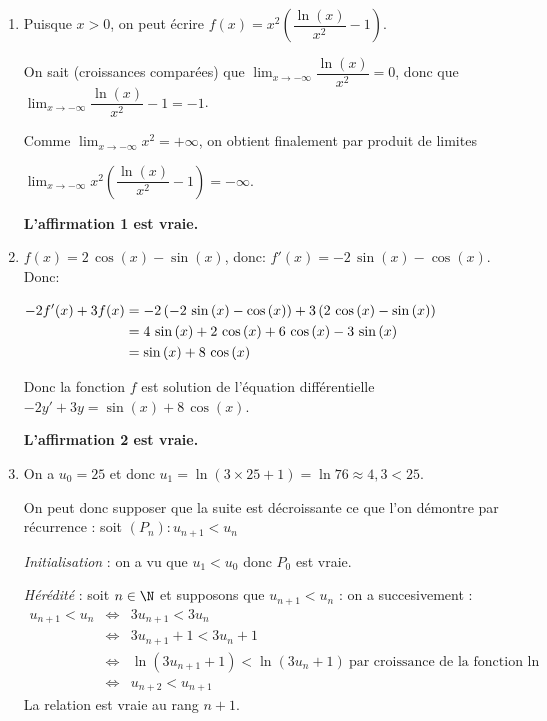 

\smallskip

\begin{enumerate}
\item Puisque $x > 0$, on peut écrire $f(x) = x^2\left(\dfrac{\ln (x)}{x^2}  - 1\right)$.

On sait (croissances comparées) que $\displaystyle\lim_{x \to - \infty} \dfrac{\ln (x)}{x^2} = 0$, donc que $\displaystyle\lim_{x \to - \infty} \dfrac{\ln (x)}{x^2} - 1 = - 1$.

Comme $\displaystyle\lim_{x \to - \infty}x^2 = + \infty$, on obtient finalement par produit de limites 

$\displaystyle\lim_{x \to - \infty} x^2 \left(\dfrac{\ln (x)}{x^2}  - 1\right) = - \infty$.

\hfill\textbf{L'affirmation 1 est vraie.}

\item $f(x)=2\,\cos\left (x\right )- \sin\left (x\right )$, donc:
$f'(x)= -2\,\sin\left (x\right ) - \cos\left (x\right )$. Donc:

$\aligned[t]
- 2f'(x) + 3f(x) 
& = -2\left ( -2\,\sin\left (x\right ) - \cos\left (x\right )\right ) +3 \left (2\,\cos\left (x\right )- \sin\left (x\right ) \right )\\
& = 4\,\sin\left (x\right ) +2\,\cos\left (x\right ) +6\,\cos\left (x\right ) -3\,\sin\left (x\right )\\
 & = \sin\left (x\right ) +8\,\cos\left (x\right )
\endaligned$

Donc la fonction $f$ est solution de l'équation différentielle $-2y' +3y =  \sin\left (x\right ) +8\,\cos\left (x\right )$.

\hfill\textbf{L'affirmation 2 est vraie.}

\item On a $u_0 = 25$ et donc $u_1 = \ln (3 \times 25 + 1) = \ln 76 \approx 4,3 < 25$.

On peut donc supposer que la suite est décroissante ce que l'on démontre par récurrence : soit $(P_n) : u_{n+1} < u_n$

\textit{Initialisation} : on a vu que $u_1 < u_0$ donc $P_0$ est vraie.

\textit{Hérédité} : soit $n \in \N$ et supposons que $u_{n+1} < u_n$ : on a succesivement :
\begin{eqnarray*}
u_{n+1} < u_n &\iff & 3u_{n+1} < 3u_n\\
&\iff &3u_{n+1} + 1 < 3u_n + 1\\
&\iff &\ln \left(3u_{n+1} + 1\right) < \ln \left(3u_n + 1\right)\:\text{par croissance de la fonction ln}\\
&\iff &u_{n+2} < u_{n+1}
\end{eqnarray*}
La relation est vraie au rang $n+1$.


\end{enumerate}
